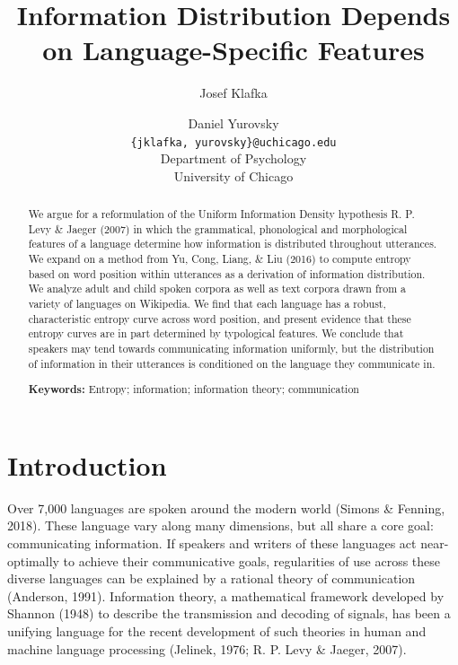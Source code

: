 \documentclass[10pt, letterpaper]{article}
\title{Information Distribution Depends on Language-Specific Features}
\author{Josef Klafka \and Daniel Yurovsky \\
        \texttt{\{jklafka, yurovsky\}@uchicago.edu} \\
       Department of Psychology \\ University of Chicago}
\begin{document}
\maketitle

\begin{abstract}
We argue for a reformulation of the Uniform Information Density
hypothesis R. P. Levy \& Jaeger (2007) in which the grammatical,
phonological and morphological features of a language determine how
information is distributed throughout utterances. We expand on a method
from Yu, Cong, Liang, \& Liu (2016) to compute entropy based on word
position within utterances as a derivation of information distribution.
We analyze adult and child spoken corpora as well as text corpora drawn
from a variety of languages on Wikipedia. We find that each language has
a robust, characteristic entropy curve across word position, and present
evidence that these entropy curves are in part determined by typological
features. We conclude that speakers may tend towards communicating
information uniformly, but the distribution of information in their
utterances is conditioned on the language they communicate in.

\textbf{Keywords:}
Entropy; information; information theory; communication
\end{abstract}

\section{Introduction}\label{introduction}

Over 7,000 languages are spoken around the modern world (Simons \&
Fenning, 2018). These language vary along many dimensions, but all share
a core goal: communicating information. If speakers and writers of these
languages act near-optimally to achieve their communicative goals,
regularities of use across these diverse languages can be explained by a
rational theory of communication (Anderson, 1991). Information theory, a
mathematical framework developed by Shannon (1948) to describe the
transmission and decoding of signals, has been a unifying language for
the recent development of such theories in human and machine language
processing (Jelinek, 1976; R. P. Levy \& Jaeger, 2007).
\end{document}
